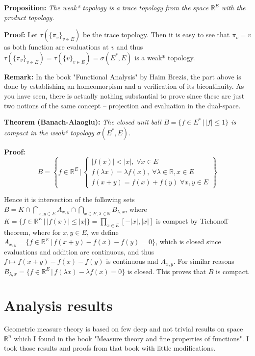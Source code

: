 \documentclass{article}
\begin{document}
\vspace{1ex}
\textbf{Proposition:} \textit{The weak* topology is a trace topology from the space
$\mathbb{R}^E$ with the product topology.}

\vspace{1ex}
\textbf{Proof:} Let $\tau(\{\pi_v\}_{v\in E})$ be the trace topology. Then it
is easy to see that $\pi_v=v$ as both function are evaluations at $v$ and thus
$\tau(\{\pi_v\}_{v\in E})=\tau(\{v\}_{v\in E})=\sigma(E^*, E)$ is a weak*
topology.

\vspace{1ex}
\textbf{Remark:} In the book "Functional Analysis" by Haim Brezis, the part
above is done by establishing an homeomorpism and a verification of its bicontinuity.
As you have seen, there is actually nothing substantial to prove since these are 
just two notions of the same concept – projection and evaluation in the dual-space.

\vspace{1ex}
\textbf{Theorem (Banach-Alaoglu):} \textit{The closed unit ball $B=\{f\in E^*\,|\,|
f|\leq 1\}$ is compact in the weak* topology $\sigma(E^*, E)$.}

\vspace{1ex}
\textbf{Proof:}
\[ B=\left\{f\in\mathbb{R}^E\,|\,
\begin{cases}
    |f(x)|<|x|,\;\forall x\in E\\
    f(\lambda x)=\lambda f(x),\;\forall\lambda\in\mathbb{R}, x\in E\\
    f(x+y)=f(x)+f(y)\;\forall x,y\in E
\end{cases}
\right\} \] 

Hence it is intersection of the following sets $B=K\cap\bigcap_{x,y\in E} A_{x,y}
\cap\bigcap_{x\in E, \lambda\in\mathbb{R}}B_{\lambda,x}$, where $K=\{f\in\mathbb
{R}^E\,|\,|f(x)|\leq|x|\}=\prod_{x\in E}[-|x|, |x|]$ is compact by Tichonoff
theorem, where for $x,y\in E$, we define $A_{x,y}=\{f\in\mathbb{R}^E\,|\,f(x+y)-
f(x)-f(y)=0\}$, which is closed since evaluations and addition are continuous, and
thus $f\mapsto f(x+y)-f(x)-f(y)$ is continuous and $A_{x,y}$. For similar
reasons $B_{\lambda, x}=\{f\in\mathbb{R}^E\,|\,f(\lambda x)-\lambda f(x)=0\}$ is
closed. This proves that $B$ is compact.

\section{Analysis results}

Geometric measure theory is based on few deep and not trivial results on space
$\mathbb{R}^n$ which I found in the book "Measure theory and fine properties
of functions". I took those results and proofs from that book with little
modifications.
\end{document}
